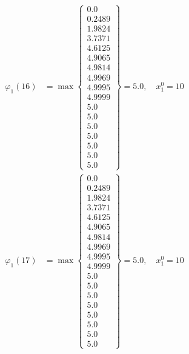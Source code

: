 \documentclass{article}
\begin{document}
\begin{align*}
  
  
  
\varphi_{1}(16) &= \max \left\{ \begin{array}{c}
0.0 \\
 0.2489 \\
 1.9824 \\
 3.7371 \\
 4.6125 \\
 4.9065 \\
 4.9814 \\
 4.9969 \\
 4.9995 \\
 4.9999 \\
 5.0 \\
 5.0 \\
 5.0 \\
 5.0 \\
 5.0 \\
 5.0 \\
 5.0
\end{array} \right\}=5.0,\quad x_{1}^0=10\\
  
  
  
  
\varphi_{1}(17) &= \max \left\{ \begin{array}{c}
0.0 \\
 0.2489 \\
 1.9824 \\
 3.7371 \\
 4.6125 \\
 4.9065 \\
 4.9814 \\
 4.9969 \\
 4.9995 \\
 4.9999 \\
 5.0 \\
 5.0 \\
 5.0 \\
 5.0 \\
 5.0 \\
 5.0 \\
 5.0 \\
 5.0
\end{array} \right\}=5.0,\quad x_{1}^0=10\\
  
  
  

\end{align*}
\end{document}
